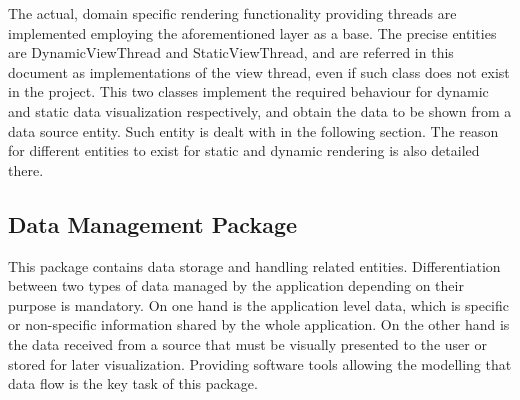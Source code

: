 		The actual, domain specific rendering functionality providing threads are implemented employing the aforementioned layer as a base. The precise entities are DynamicViewThread and StaticViewThread, and are referred in this document as implementations of the view thread, even if such class does not exist in the project. This two classes implement the required behaviour for dynamic and static data visualization respectively, and obtain the data to be shown from a data source entity. Such entity is dealt with in the following section. The reason for different entities to exist for static and dynamic rendering is also detailed there.\\

		\subsection{Data Management Package}

		
		This package contains data storage and handling related entities. Differentiation between two types of data managed by the application depending on their purpose is mandatory. On one hand is the application level data, which is specific or non-specific information shared by the whole application. On the other hand is the data received from a source that must be visually presented to the user or stored for later visualization. Providing software tools allowing the modelling that data flow is the key task of this package.\\

